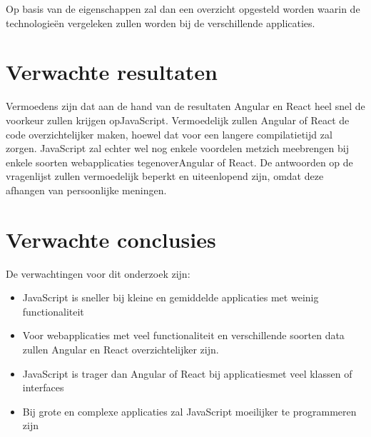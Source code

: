 Op basis van de eigenschappen zal dan een overzicht opgesteld worden waarin de technologieën vergeleken zullen worden bij de verschillende applicaties.

\section{Verwachte resultaten}
\label{sec:verwachte_resultaten}

Vermoedens zijn dat aan de hand van de resultaten Angular en React heel snel de voorkeur zullen krijgen opJavaScript. Vermoedelijk zullen Angular of React de code overzichtelijker maken, hoewel dat voor een langere compilatietijd zal zorgen. JavaScript zal echter wel nog enkele voordelen metzich meebrengen bij enkele soorten webapplicaties tegenoverAngular of React. De antwoorden op de vragenlijst zullen vermoedelijk beperkt en uiteenlopend zijn, omdat deze afhangen van persoonlijke meningen.

\section{Verwachte conclusies}
\label{sec:verwachte_conclusies}

De verwachtingen voor dit onderzoek zijn:
\begin{itemize}
	\item JavaScript is sneller bij kleine en gemiddelde applicaties met weinig functionaliteit
	\item Voor webapplicaties met veel functionaliteit en verschillende soorten data zullen Angular en React overzichtelijker zijn.
	\item JavaScript is trager dan Angular of React bij applicatiesmet veel klassen of interfaces
	\item Bij grote en complexe applicaties zal JavaScript moeilijker te programmeren zijn
\end{itemize}

